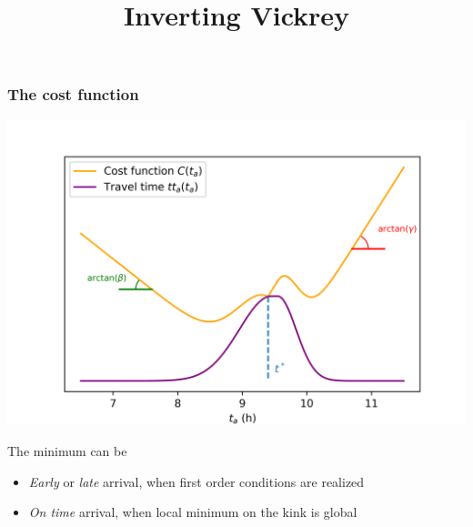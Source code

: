 \documentclass{beamer}
\title{Inverting Vickrey}
\date{}
\begin{document}
\begin{frame}{\titlepage}
  
\end{frame}

\begin{frame}
  \frametitle{The cost function}
  \begin{center}
    \includegraphics[width=.85\textwidth]{cost}
  \end{center}
  
  The minimum can be
  \begin{itemize}
  \item \textit{Early} or \textit{late} arrival, when first order conditions are realized
  \item \textit{On time} arrival, when local minimum on the kink is global
  \end{itemize}
\end{frame}
\end{document}
